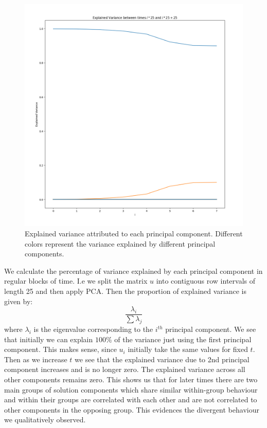 \documentclass[a4paper, oneside]{book}
\begin{document}
\begin{figure}[htpb]
    \centering
    \includegraphics[width=1.0\textwidth]{./images/Pasted image 20231207142335.png}
    \caption{Explained variance attributed to each principal component. Different colors represent the variance explained by different principal components.}
\end{figure}

We calculate the percentage of variance explained by each principal component
in regular blocks of time. I.e we split the matrix $u$ into contiguous row intervals of length
25 and then apply PCA. Then the proportion of explained variance is given by:
$$
\frac{\lambda_{i}}{\sum \lambda _{j}}
$$
where $\lambda_{i}$ is the eigenvalue corresponding to the $i^{th}$ principal component.
We see that initially we can explain $100\%$ of the variance just using the first principal component.
This makes sense, since $u_{i}$ initially take the same values for fixed $t$. Then as we increase
$t$ we see that the explained variance due to 2nd principal component increases
and is no longer zero. The explained variance across all other components
remains zero. This shows us that for later times there are two main groups of solution
components which share similar within-group behaviour and within their groups
are correlated with each other and are not correlated to other components
in the opposing group. This evidences the divergent behaviour we qualitatively observed.
\end{document}
